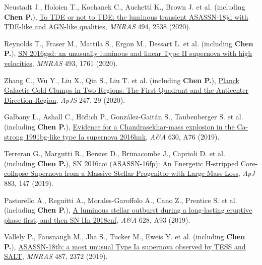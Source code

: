 \item Neustadt J., Holoien T., Kochanek C., Auchettl K., Brown J. et al. (including \textbf{Chen P.}), \href{https://ui.adsabs.harvard.edu/abs/2020MNRAS.494.2538N}{To TDE or not to TDE: the luminous transient ASASSN-18jd with TDE-like and AGN-like qualities}, \textit{MNRAS} 494, 2538 (2020).

\item Reynolds T., Fraser M., Mattila S., Ergon M., Dessart L. et al. (including \textbf{Chen P.}), \href{https://ui.adsabs.harvard.edu/abs/2020MNRAS.493.1761R}{SN 2016gsd: an unusually luminous and linear Type II supernova with high velocities}, \textit{MNRAS} 493, 1761 (2020).

\item Zhang C., Wu Y., Liu X., Qin S., Liu T. et al. (including \textbf{Chen P.}), \href{https://ui.adsabs.harvard.edu/abs/2020ApJS..247...29Z}{Planck Galactic Cold Clumps in Two Regions: The First Quadrant and the Anticenter Direction Region}, \textit{ApJS} 247, 29 (2020).

\item Galbany L., Ashall C., H{\"o}flich P., Gonz{\'a}lez-Gait{\'a}n S., Taubenberger S. et al. (including \textbf{Chen P.}), \href{https://ui.adsabs.harvard.edu/abs/2019A&A...630A..76G}{Evidence for a Chandrasekhar-mass explosion in the Ca-strong 1991bg-like type Ia supernova 2016hnk}, \textit{A\&A} 630, A76 (2019).

\item Terreran G., Margutti R., Bersier D., Brimacombe J., Caprioli D. et al. (including \textbf{Chen P.}), \href{https://ui.adsabs.harvard.edu/abs/2019ApJ...883..147T}{SN 2016coi (ASASSN-16fp): An Energetic H-stripped Core-collapse Supernova from a Massive Stellar Progenitor with Large Mass Loss}, \textit{ApJ} 883, 147 (2019).

\item Pastorello A., Reguitti A., Morales-Garoffolo A., Cano Z., Prentice S. et al. (including \textbf{Chen P.}), \href{https://ui.adsabs.harvard.edu/abs/2019A&A...628A..93P}{A luminous stellar outburst during a long-lasting eruptive phase first, and then SN IIn 2018cnf}, \textit{A\&A} 628, A93 (2019).

\item Vallely P., Fausnaugh M., Jha S., Tucker M., Eweis Y. et al. (including \textbf{Chen P.}), \href{https://ui.adsabs.harvard.edu/abs/2019MNRAS.487.2372V}{ASASSN-18tb: a most unusual Type Ia supernova observed by TESS and SALT}, \textit{MNRAS} 487, 2372 (2019).

